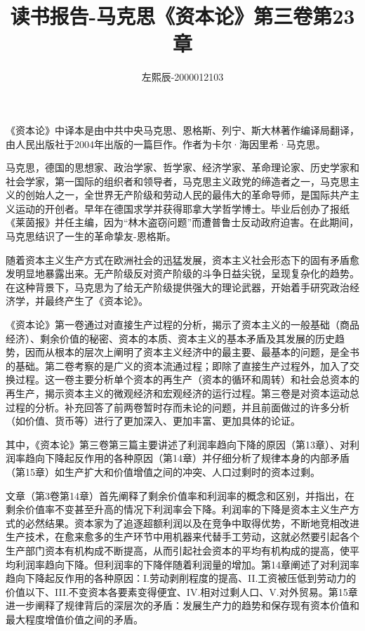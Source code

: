 \documentclass[utf8]{ctexart}
\title{读书报告-马克思《资本论》第三卷第23章}
\author{左熙辰-2000012103}
\date{}
\begin{document}
	\maketitle
	《资本论》中译本是由中共中央马克思、恩格斯、列宁、斯大林著作编译局翻译，由人民出版社于2004年出版的一篇巨作。作者为卡尔·海因里希·马克思。
	
	马克思，德国的思想家、政治学家、哲学家、经济学家、革命理论家、历史学家和社会学家，第一国际的组织者和领导者，马克思主义政党的缔造者之一，马克思主义的创始人之一，全世界无产阶级和劳动人民的最伟大的革命导师，是国际共产主义运动的开创者。早年在德国求学并获得耶拿大学哲学博士。毕业后创办了报纸《莱茵报》并任主编，因为“林木盗窃问题”而遭普鲁士反动政府迫害。在此期间，马克思结识了一生的革命挚友-恩格斯。
	
	随着资本主义生产方式在欧洲社会的迅猛发展，资本主义社会形态下的固有矛盾愈发明显地暴露出来。无产阶级反对资产阶级的斗争日益尖锐，呈现复杂化的趋势。在这种背景下，马克思为了给无产阶级提供强大的理论武器，开始着手研究政治经济学，并最终产生了《资本论》。
	
	《资本论》第一卷通过对直接生产过程的分析，揭示了资本主义的一般基础（商品经济）、剩余价值的秘密、资本的本质、资本主义的基本矛盾及其发展的历史趋势，因而从根本的层次上阐明了资本主义经济中的最主要、最基本的问题，是全书的基础。第二卷考察的是广义的资本流通过程；即除了直接生产过程外，加入了交换过程。这一卷主要分析单个资本的再生产（资本的循环和周转）和社会总资本的再生产，揭示资本主义的微观经济和宏观经济的运行过程。第三卷是对资本运动总过程的分析。补充回答了前两卷暂时存而未论的问题，并且前面做过的许多分析（如价值、货币等）进行了更加深入、更加丰富、更加具体的论证。
	
	其中，《资本论》第三卷第三篇主要讲述了利润率趋向下降的原因（第13章）、对利润率趋向下降起反作用的各种原因（第14章）并仔细分析了规律本身的内部矛盾（第15章）如生产扩大和价值增值之间的冲突、人口过剩时的资本过剩。
	
	文章（第3卷第14章）首先阐释了剩余价值率和利润率的概念和区别，并指出，在剩余价值率不变甚至升高的情况下利润率会下降。利润率的下降是资本主义生产方式的必然结果。资本家为了追逐超额利润以及在竞争中取得优势，不断地竞相改进生产技术，在愈来愈多的生产环节中用机器来代替手工劳动，这就必然要引起各个生产部门资本有机构成不断提高，从而引起社会资本的平均有机构成的提高，使平均利润率趋向下降。但利润率的下降伴随着利润量的增加。第14章阐述了对利润率趋向下降起反作用的各种原因：I.劳动剥削程度的提高、II.工资被压低到劳动力的价值以下、III.不变资本各要素变得便宜、IV.相对过剩人口、V.对外贸易。第15章进一步阐释了规律背后的深层次的矛盾：发展生产力的趋势和保存现有资本价值和最大程度增值价值之间的矛盾。
	
\end{document}
